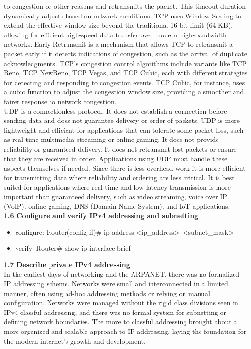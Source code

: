 \documentclass{article}
\begin{document}
to congestion or other reasons and retransmits the packet. This timeout duration dynamically adjusts based on network conditions. TCP uses Window Scaling to extend the effective window size beyond the traditional 16-bit limit (64 KB), allowing for efficient high-speed data transfer over modern high-bandwidth networks. Early Retransmit is a mechanism that allows TCP to retransmit a packet early if it detects indications of congestion, such as the arrival of duplicate acknowledgments. TCP's congestion control algorithms include variants like TCP Reno, TCP NewReno, TCP Vegas, and TCP Cubic, each with different strategies for detecting and responding to congestion events. TCP Cubic, for instance, uses a cubic function to adjust the congestion window size, providing a smoother and fairer response to network congestion.\\

	UDP is a connectionless protocol. It does not establish a connection before sending data and does not guarantee delivery or order of packets. UDP is more lightweight and efficient for applications that can tolerate some packet loss, such as real-time multimedia streaming or online gaming. It does not provide reliability or guaranteed delivery. It does not retransmit lost packets or ensure that they are received in order. Applications using UDP must handle these aspects themselves if needed. Since there is less overhead work it is more efficient for transmitting data where reliability and ordering are less critical. It is best suited for applications where real-time and low-latency transmission is more important than guaranteed delivery, such as video streaming, voice over IP (VoIP), online gaming, DNS (Domain Name System), and IoT applications.\\
  	
\noindent\textbf{1.6 Configure and verify IPv4 addressing and subnetting}

\begin{itemize}
\item configure: Router(config-if)\# ip address \textless ip\_address\textgreater\ \textless subnet\_mask\textgreater
\item verify: Router\# show ip interface brief
\end{itemize}
  
\noindent\textbf{1.7 Describe private IPv4 addressing}\\

		In the earliest days of networking and the ARPANET, there was no formalized IP addressing scheme. Networks were small and interconnected in a limited manner, often using ad-hoc addressing methods or relying on manual configuration. Networks were managed without the rigid class divisions seen in IPv4 classful addressing, and there was no formal system for subnetting or defining network boundaries. The move to classful addressing brought about a more organized and scalable approach to IP addressing, laying the foundation for the modern internet's growth and development.\\
		
\end{document}

